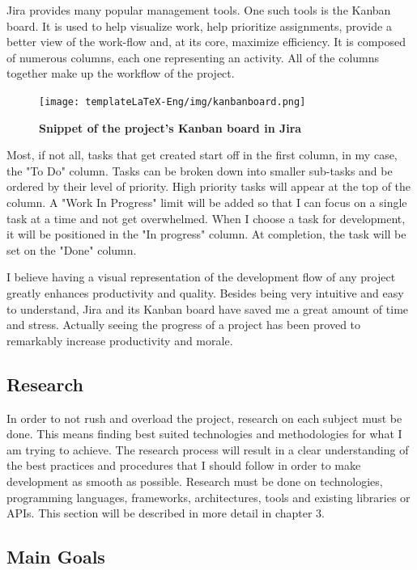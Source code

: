 \documentclass[12pt,a4paper,twoside]{report}
\begin{document}
Jira provides many popular management tools. One such tools is the Kanban board. It is used to help visualize work, help prioritize assignments, provide a better view of the work-flow and, at its core, maximize efficiency. It is composed of numerous columns, each one representing an activity. All of the columns together make up the workflow of the project. 

\begin{figure}[H]
    \texttt{[image: templateLaTeX-Eng/img/kanbanboard.png]}
    \caption{\bf Snippet of the project's Kanban board in Jira}
\end{figure}

Most, if not all, tasks that get created start off in the first column, in my case, the "To Do" column. Tasks can be broken down into smaller sub-tasks and be ordered by their level of priority. High priority tasks will appear at the top of the column. A "Work In Progress" limit will be added so that I can focus on a single task at a time and not get overwhelmed. When I choose a task for development, it will be positioned in the "In progress" column. At completion, the task will be set on the "Done" column.

I believe having a visual representation of the development flow of any project greatly enhances productivity and quality. Besides being very intuitive and easy to understand, Jira and its Kanban board have saved me a great amount of time and stress. Actually seeing the progress of a project has been proved to remarkably increase productivity and morale.

\subsection{Research}

In order to not rush and overload the project, research on each subject must be done. This means finding best suited technologies and methodologies for what I am trying to achieve. The research process will result in a clear understanding of the best practices and procedures that I should follow in order to make development as smooth as possible. Research must be done on technologies, programming languages, frameworks, architectures, tools and existing libraries or APIs. This section will be described in more detail in chapter 3.

\subsection{Main Goals}
\end{document}

